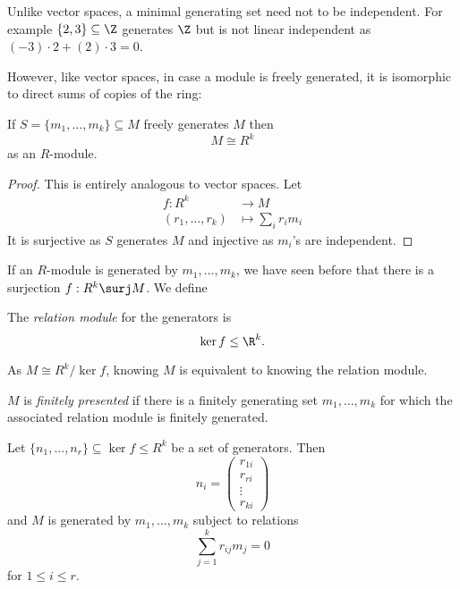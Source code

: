 \documentclass[a4paper]{article}
\begin{document}
\begin{eg}
  Unlike vector spaces, a minimal generating set need not to be independent. For example \(\{2, 3\} \subseteq \Z\) generates \(\Z\) but is not linear independent as \((-3) \cdot 2 + (2) \cdot 3 = 0\).
\end{eg}

However, like vector spaces, in case a module is freely generated, it is isomorphic to direct sums of copies of the ring:

\begin{lemma}
  If \(S = \{m_1, \dots, m_k\} \subseteq M\) freely generates \(M\) then
  \[
    M \cong R^k
  \]
  as an \(R\)-module.
\end{lemma}

\begin{proof}
  This is entirely analogous to vector spaces. Let
  \begin{align*}
    f: R^k &\to M \\
    (r_1, \dots, r_k) &\mapsto \sum_i r_im_i
  \end{align*}
  It is surjective as \(S\) generates \(M\) and injective as \(m_i\)'s are independent.
\end{proof}

If an \(R\)-module is generated by \(m_1, \dots, m_k\), we have seen before that there is a surjection \(f: R^k \surj M\). We define

\begin{definition}
  The \emph{relation module} for the generators is
  \[
    \ker f \leq \R^k.
  \]
\end{definition}

As \(M \cong R^k/\ker f\), knowing \(M\) is equivalent to knowing the relation module.

\begin{definition}
  \(M\) is \emph{finitely presented} if there is a finitely generating set \(m_1, \dots, m_k\) for which the associated relation module is finitely generated.
\end{definition}

Let \(\{n_1, \dots, n_r\} \subseteq \ker f \leq R^k\) be a set of generators. Then
\[
  n_i =
  \begin{pmatrix}
    r_{1i} \\
    r_{ri} \\
    \vdots \\
    r_{ki}
  \end{pmatrix}
\]
and \(M\) is generated by \(m_1, \dots, m_k\) subject to relations
\[
  \sum_{j = 1}^k r_{ij} m_j = 0
\]
for \(1 \leq i\leq r\).
\end{document}
